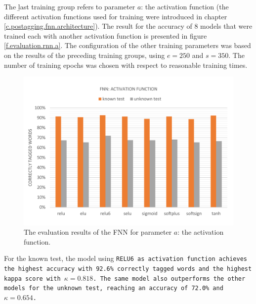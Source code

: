 The \b{last training group} refers to parameter $a$: the activation function (the different activation functions used for training were introduced in chapter \ref{c.postagging.fnn.architecture}). The result for the accuracy of 8 models that were trained each with another activation function is presented in figure \ref{f.evaluation.rnn.a}. The configuration of the other training parameters was based on the results of the preceding training groups, using $e=250$ and $s=350$. The number of training epochs was chosen with respect to reasonable training times.

\begin{figure}[H]
	\hspace{-5mm}\includegraphics[width=1.07\textwidth]{images/evaluation_fnn_a}
	\caption[FNN Evaluation: Activation Function]{The evaluation results of the FNN for parameter $a$: the activation function.}
	\label{f.evaluation.fnn.a}
\end{figure}

For the known test, the model using \tt{RELU6} as activation function achieves the highest accuracy with 92.6\% correctly tagged words and the highest kappa score with $\kappa=0.818$. The same model also outperforms the other models for the unknown test, reaching an accuracy of 72.0\% and $\kappa=0.654$.

